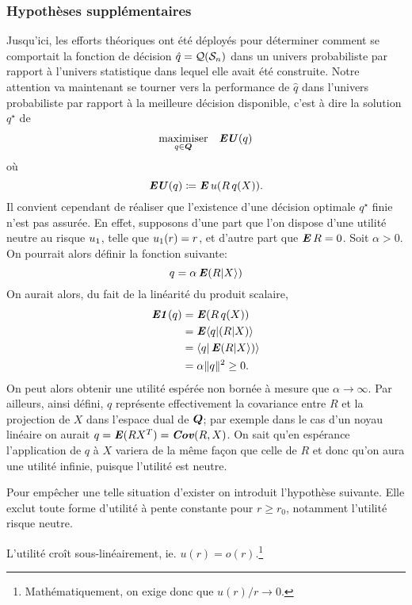 \subsubsection{Hypothèses supplémentaires}



Jusqu'ici, les efforts théoriques ont été déployés pour déterminer comment se comportait
la fonction de décision $\hat q = \alg(\S_n)$ dans un univers probabiliste par rapport à
l'univers statistique dans lequel elle avait été construite. Notre attention va maintenant
se tourner vers la performance de $\hat q$ dans l'univers probabiliste par rapport à la
meilleure décision disponible, c'est à dire la solution $q^\star$ de 
\begin{equation}
  \maximizeEquation[q \in \Q]{\EU(q)}
\end{equation}
où
\begin{equation}
  \EU(q) \coloneq \E u(R\,q(X)).
\end{equation}
Il convient cependant de réaliser que l'existence d'une décision optimale $q^\star$ finie
n'est pas assurée. En effet, supposons d'une part que l'on dispose d'une utilité neutre au
risque $\rn$, telle que $\rn(r) = r$, et d'autre part que $\E R=0$. Soit $\alpha>0$. On
pourrait alors définir la fonction suivante:
\begin{equation}
  q = \alpha\E(R|X\rangle)
\end{equation}
On aurait alors, du fait de la linéarité du produit scalaire,
\begin{align}
  \EN(q) & = \E(R\,q(X))\\
         & = \E\langle q|(R|X)\rangle\\
         & = \langle q|\E(R|X\rangle)\rangle\\
         & = \alpha\|q\|^2 \geq 0.
\end{align}
On peut alors obtenir une utilité espérée non bornée à mesure que $\alpha\to\infty$. Par ailleurs,
ainsi défini, $q$ représente effectivement la covariance entre $R$ et la projection de $X$
dans l'espace dual de $\Q$; par exemple dans le cas d'un noyau linéaire on aurait
$q = \E(RX^T) = \Cov(R,X)$. On sait qu'en espérance l'application de $q$ à $X$ variera de
la même façon que celle de $R$ et donc qu'on aura une utilité infinie, puisque l'utilité
est neutre.

Pour empêcher une telle situation d'exister on introduit l'hypothèse suivante. Elle exclut
toute forme d'utilité à pente constante pour $r \geq r_0$, notamment l'utilité risque neutre.
\begin{assumption}
  L'utilité croît sous-linéairement, ie. $u(r) = o(r)$.\footnote{Mathématiquement, on exige
    donc que $u(r)/r \to 0$.} 
\end{assumption}

